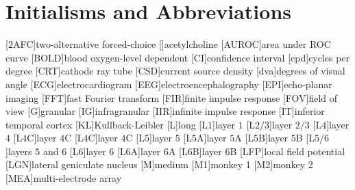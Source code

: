     \chapter*{Initialisms and Abbreviations}
    \begin{acronym}[AUROC]
        [$2$AFC]{two-alternative forced-choice}
        []{acetylcholine}
        [AUROC]{area under \acl{ROC} curve}
        [BOLD]{blood oxygen-level dependent}
        [CI]{confidence interval}
        [cpd]{cycles per degree}
        [CRT]{cathode ray tube}
        [CSD]{current source density}
        [dva]{degrees of visual angle}
        [ECG]{electrocardiogram}
        [EEG]{electroencephalography}
        [EPI]{echo-planar imaging}
        [FFT]{fast Fourier transform}
        [FIR]{finite impulse response}
        [FOV]{field of view}
        [G]{granular}
        [IG]{infragranular}
        [IIR]{infinite impulse response}
        [IT]{inferior temporal cortex}
        [KL]{Kullback-Leibler}
        [L]{long}
        [L$1$]{layer $1$}
        [L$2/3$]{layer $2/3$}
        [L$4$]{layer $4$}
        [L$4$C\textalpha]{layer $4$C\textalpha{}}
        [L$4$C\textbeta]{layer $4$C\textbeta{}}
        [L$5$]{layer $5$}
        [L$5$A]{layer $5$A}
        [L$5$B]{layer $5$B}
        [L$5/6$]{layers $5$ and $6$}
        [L$6$]{layer $6$}
        [L$6$A]{layer $6$A}
        [L$6$B]{layer $6$B}
        [LFP]{local field potential}
        [LGN]{lateral geniculate nucleus}
        [M]{medium}
        [M1]{monkey 1}
        [M2]{monkey 2}
        [MEA]{multi-electrode array}

\end{acronym}
